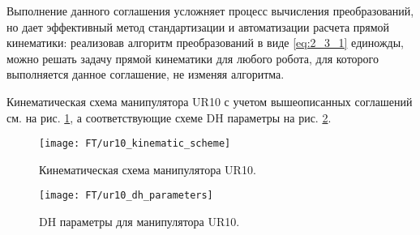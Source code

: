 Выполнение данного соглашения усложняет процесс вычисления преобразований, но дает эффективный метод стандартизации и автоматизации расчета прямой кинематики: реализовав алгоритм преобразований в виде \ref{eq:2_3_1} единожды, можно решать задачу прямой кинематики для любого робота, для которого выполняется данное соглашение, не изменяя алгоритма.

Кинематическая схема манипулятора UR10 с учетом вышеописанных соглашений см. на рис. \ref{fig:2_2}, а соответствующие схеме DH параметры на рис. \ref{fig:2_3}.
\begin{figure}[h!]
	\centering
	\texttt{[image: FT/ur10\_kinematic\_scheme]}
	\caption{Кинематическая схема манипулятора UR10.}
	\label{fig:2_2}
\end{figure}
\begin{figure}[h!]
	\centering
	\texttt{[image: FT/ur10\_dh\_parameters]}
	\caption{DH параметры для манипулятора UR10.}
	\label{fig:2_3}
\end{figure}
